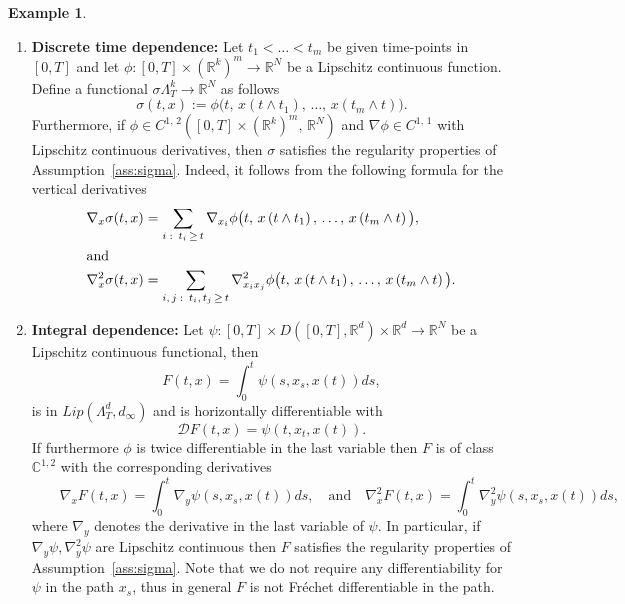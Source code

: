 \documentclass[10pt]{amsart}
\theoremstyle{definition}\newtheorem{defi}[theo]{Definition}\newtheorem{rema}[theo]{Remark}\newtheorem{exam}[theo]{Example}\newtheorem{exem}[theo]{Example}\newtheorem{nota}[theo]{Notation}
\newcommand{\epsi}{\varepsilon}
\newcommand{\bbC}{\mathbb{C}}
\newcommand{\calD}{\mathcal{D}}
\newcommand{\Rr}{{\mathbb{R}}}
\begin{document}
\begin{exam}
\begin{enumerate}
The above functionals can be adapted for multidimensional paths. Let $\varphi\colon\Rr^d\to\Rr_+$ be a Lipschitz continuous functional, consider the following non-anticipative functional:
\[
b(t, x):=m(t,\,\varphi\circ x).
\]
Under the assumptions on $\varphi$ one can easily check that $b$ is boundedness preserving and $b\in Lip(\Lambda^{d}_T, d_{\infty})$. If the function $\varphi\in C^2$ with Lipschitz continuous derivatives then the functional
\[
\sigma(t,x):=M_{\epsi,\,h}\left(t,\,\varphi\circ x\right)
\]
satisfies Assumption~\ref{ass:sigma}.

\item{\bf {Discrete time dependence}:} Let $t_1<\ldots<t_m$ be given time-points in $[0,T]$ and let $\phi\colon[0,T]\times (\Rr^k)^m\to \Rr^N$ be a Lipschitz continuous function. Define a functional $\sigma\Lambda_T^k\to\Rr^N$ as follows
\[
\sigma(t, x):=\phi\big(t,\, x(t\wedge t_1),\,\ldots,\, x(t_m\wedge t)\big).
\]
Furthermore, if $\phi\in C^{1,\,2}([0,T]\times (\Rr^k)^m, \,\Rr^N)$ and $\nabla\phi\in C^{1,\,1}$ with Lipschitz continuous derivatives, then $\sigma$ satisfies the regularity properties of Assumption~\ref{ass:sigma}. Indeed, it follows from the following formula for the vertical derivatives
\begin{align*}
\nabla_{{x}}\sigma(t, x) &=\sum_{i\,\colon\,t_i\,\geq\,t}\nabla_{x_i}\phi\big(t,\, x\left(t\wedge t_1\right),\,\ldots,\, x\left(t_m\wedge t\right)\big),
\\
\intertext{and}
\nabla^2_{x}\sigma(t, x) &=\sum_{i,\,j\,\colon\,t_i,\,t_j\,\geq\,t}\nabla^2_{x_i x_j}\phi\big(t,\, x\left(t\wedge t_1\right),\,\ldots,\, x\left(t_m\wedge t\right)\big).
\end{align*}
\item{\bf {Integral dependence}:} Let $\psi\colon[0,T]\times D([0,T], \Rr^d)\times \Rr^d\to \Rr^N$ be a Lipschitz continuous functional, then
\[
F(t, x)=\int_0^t \psi(s, x_s, x(t)) ds,
\]
is in $ Lip(\Lambda^{d}_T, d_{\infty})$ and is horizontally differentiable with
\[
\calD F(t, x)=\psi(t, x_t, x(t)).
\]
If furthermore $\phi$ is twice differentiable in the last variable then $F$ is of class $\bbC^{1,2}$ with the corresponding derivatives
\[
\qquad \nabla_{{x}}F(t, x)=\int_0^t \nabla_{y}\psi(s, x_s, x(t)) ds,\quad\text{and}\quad\nabla^2_{{x}}F(t, x)=\int_0^t \nabla^2_{y}\psi(s, x_s, x(t)) ds,
\]
where $\nabla_{y}$ denotes the derivative in the last variable of $\psi$. In particular, if $ \nabla_{y}\psi, \nabla^2_{y}\psi$ are Lipschitz continuous then $F$ satisfies the regularity properties of Assumption~\ref{ass:sigma}. Note that we do not require any differentiability for $\psi$ in the path $x_s$, thus in general $F$ is not Fréchet differentiable in the path.
\end{enumerate}
\end{exam}
\end{document}
